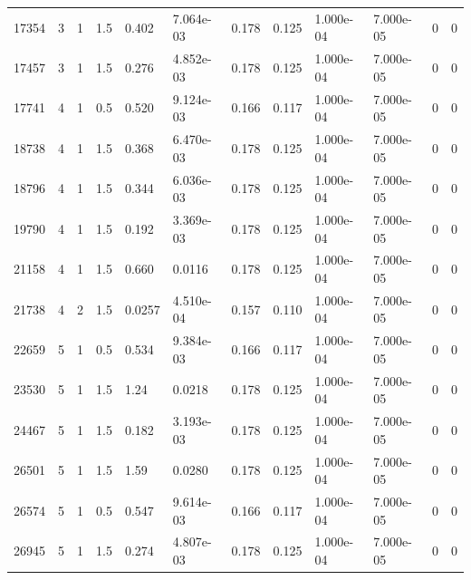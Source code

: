 \documentclass[preview]{standalone}
\begin{document}
{{\begin{tabular}{L{1.2cm}C{1.2cm} C{0.3cm}C{0.5cm} C{1.4cm}C{1.4cm} C{1.4cm}C{1.4cm} C{1.6cm}C{1.6cm} C{1.6cm}C{1.6cm}}
  17354  &     3  & 1     & 1.5 &  0.402  & 7.064e-03  &  0.178&   0.125& 1.000e-04 & 7.000e-05   &  0 & 0  \\ 
  17457  &     3  & 1     & 1.5 &  0.276  & 4.852e-03  &  0.178&   0.125& 1.000e-04 & 7.000e-05   &  0 & 0  \\ 
  17741  &     4  & 1     & 0.5 &  0.520  & 9.124e-03  &  0.166&   0.117& 1.000e-04 & 7.000e-05   &  0 & 0  \\ 
  18738  &     4  & 1     & 1.5 &  0.368  & 6.470e-03  &  0.178&   0.125& 1.000e-04 & 7.000e-05   &  0 & 0  \\ 
  18796  &     4  & 1     & 1.5 &  0.344  & 6.036e-03  &  0.178&   0.125& 1.000e-04 & 7.000e-05   &  0 & 0  \\ 
  19790  &     4  & 1     & 1.5 &  0.192  & 3.369e-03  &  0.178&   0.125& 1.000e-04 & 7.000e-05   &  0 & 0  \\ 
  21158  &     4  & 1     & 1.5 &  0.660  & 0.0116  &  0.178&   0.125& 1.000e-04 & 7.000e-05   &  0 & 0  \\ 
  21738  &     4  & 2     & 1.5 &  0.0257  & 4.510e-04  &  0.157&   0.110& 1.000e-04 & 7.000e-05   &  0 & 0  \\ 
  22659  &     5  & 1     & 0.5 &  0.534  & 9.384e-03  &  0.166&   0.117& 1.000e-04 & 7.000e-05   &  0 & 0  \\ 
  23530  &     5  & 1     & 1.5 &  1.24  & 0.0218  &  0.178&   0.125& 1.000e-04 & 7.000e-05   &  0 & 0  \\ 
  24467  &     5  & 1     & 1.5 &  0.182  & 3.193e-03  &  0.178&   0.125& 1.000e-04 & 7.000e-05   &  0 & 0  \\ 
  26501  &     5  & 1     & 1.5 &  1.59  & 0.0280  &  0.178&   0.125& 1.000e-04 & 7.000e-05   &  0 & 0  \\ 
  26574  &     5  & 1     & 0.5 &  0.547  & 9.614e-03  &  0.166&   0.117& 1.000e-04 & 7.000e-05   &  0 & 0  \\ 
  26945  &     5  & 1     & 1.5 &  0.274  & 4.807e-03  &  0.178&   0.125& 1.000e-04 & 7.000e-05   &  0 & 0  \\ 
\hline 
\end{tabular} 

}}
\end{document}
